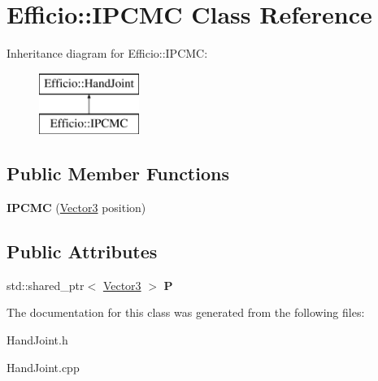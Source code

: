 \hypertarget{class_efficio_1_1_i_p_c_m_c}{}\section{Efficio\+:\+:I\+P\+C\+MC Class Reference}
\label{class_efficio_1_1_i_p_c_m_c}
Inheritance diagram for Efficio\+:\+:I\+P\+C\+MC\+:\begin{figure}[H]
\begin{center}
\leavevmode
\includegraphics[height=2.000000cm]{class_efficio_1_1_i_p_c_m_c}
\end{center}
\end{figure}
\subsection*{Public Member Functions}
\begin{DoxyCompactItemize}
\item 
{\bfseries I\+P\+C\+MC} (\hyperlink{class_efficio_1_1_vector3}{Vector3} position)\hypertarget{class_efficio_1_1_i_p_c_m_c_ab4ad858afbf608d28032acf561643a4c}{}\label{class_efficio_1_1_i_p_c_m_c_ab4ad858afbf608d28032acf561643a4c}

\end{DoxyCompactItemize}
\subsection*{Public Attributes}
\begin{DoxyCompactItemize}
\item 
std\+::shared\+\_\+ptr$<$ \hyperlink{class_efficio_1_1_vector3}{Vector3} $>$ {\bfseries P}\hypertarget{class_efficio_1_1_i_p_c_m_c_a76ef197b569b30f1ecde377e60aabcd1}{}\label{class_efficio_1_1_i_p_c_m_c_a76ef197b569b30f1ecde377e60aabcd1}

\end{DoxyCompactItemize}


The documentation for this class was generated from the following files\+:\begin{DoxyCompactItemize}
\item 
Hand\+Joint.\+h\item 
Hand\+Joint.\+cpp\end{DoxyCompactItemize}
